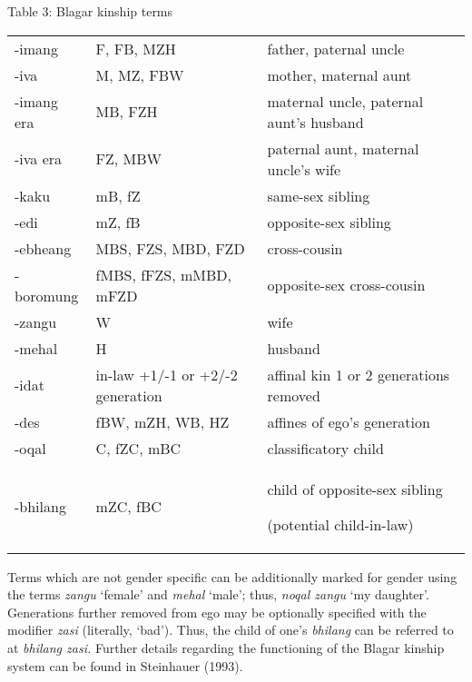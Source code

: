 {\centering
Table 3: Blagar kinship terms
\par}

\begin{center}
\tablehead{}
\begin{supertabular}{m{0.8115598in}m{2.23096in}m{2.7240598in}}
{}-imang &
F, FB, MZH &
father, paternal uncle\\
{}-iva &
M, MZ, FBW &
mother, maternal aunt\\
{}-imang era &
MB, FZH &
maternal uncle, paternal aunt{\textquoteright}s husband\\
{}-iva era &
FZ, MBW &
paternal aunt, maternal uncle{\textquoteright}s wife\\
{}-kaku &
mB, fZ &
same-sex sibling\\
{}-edi &
mZ, fB &
opposite-sex sibling\\
{}-ebheang &
MBS, FZS, MBD, FZD &
cross-cousin\\
{}-boromung &
fMBS, fFZS, mMBD, mFZD &
opposite-sex cross-cousin\\
{}-zangu &
W &
wife\\
{}-mehal &
H &
husband\\
{}-idat &
in-law +1/-1 or +2/-2 generation &
affinal kin 1 or 2 generations removed\\
{}-des &
fBW, mZH, WB, HZ &
affines of ego{\textquoteright}s generation\\
{}-oqal &
C, fZC, mBC &
classificatory child\\
{}-bhilang &
mZC, fBC &
child of opposite-sex sibling

(potential child-in-law)\\
\end{supertabular}
\end{center}
Terms which are not gender specific can be additionally marked for gender using the terms \textit{zangu }{\textquoteleft}female{\textquoteright} and \textit{mehal }{\textquoteleft}male{\textquoteright}; thus, \textit{noqal zangu }{\textquoteleft}my daughter{\textquoteright}. Generations further removed from ego may be optionally specified with the modifier \textit{zasi }(literally, {\textquoteleft}bad{\textquoteright}). Thus, the child of one{\textquoteright}s \textit{bhilang} can be referred to at \textit{bhilang zasi. }Further details regarding the functioning of the Blagar kinship system can be found in Steinhauer (1993).

